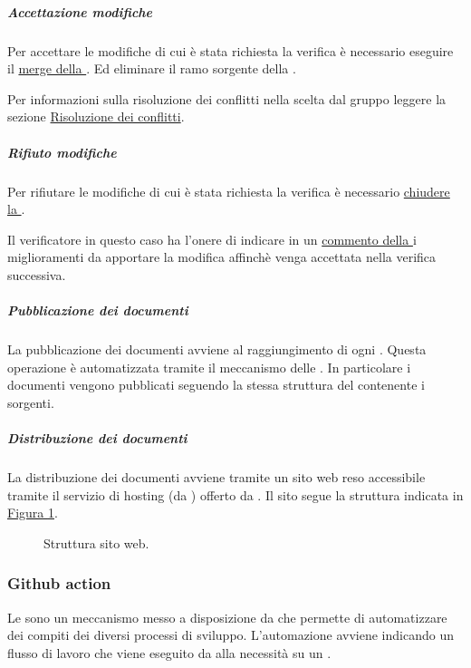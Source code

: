 \subparagraph{Accettazione modifiche}
\label{subpar:accettazione_modifiche}
Per accettare le modifiche di cui è stata richiesta la verifica è necessario eseguire il \hyperref[item:approvazione_pull_request]{merge della }.
Ed eliminare il ramo sorgente della .

Per informazioni sulla risoluzione dei conflitti nella  scelta dal gruppo leggere la sezione \hyperref[subpar:risoluzione_dei_conflitti]{Risoluzione dei conflitti}.


\subparagraph{Rifiuto modifiche}
\label{subpar:rifiuto_modifiche}
Per rifiutare le modifiche di cui è stata richiesta la verifica è necessario \hyperref[item:chiusura_pull_request]{chiudere la }.

Il verificatore in questo caso ha l'onere di indicare in un \hyperref[item:commentare_issue]{commento della } i miglioramenti da apportare la modifica affinchè venga accettata nella verifica successiva.

\subparagraph{Pubblicazione dei documenti}
La pubblicazione dei documenti avviene al raggiungimento di ogni .
Questa operazione è automatizzata tramite il meccanismo delle \hyperref[subsubsec:github_action]{}.
In particolare i documenti vengono pubblicati seguendo la stessa struttura del  contenente i sorgenti.

\subparagraph{Distribuzione dei documenti}
La distribuzione dei documenti avviene tramite un sito web reso accessibile tramite il servizio di hosting (da ) offerto da .
Il sito segue la struttura indicata in \hyperref[fig:sito_docs]{Figura \ref{fig:sito_docs}}.

\begin{figure}[!h]
\caption{Struttura sito web.}
\label{fig:sito_docs}
\end{figure}

\subsubsection{Github action}
\label{subsubsec:github_action}
Le  sono un meccanismo messo a disposizione da  che permette di automatizzare dei compiti dei diversi processi di sviluppo.
L'automazione avviene indicando un flusso di lavoro che viene eseguito da  alla necessità su un .

